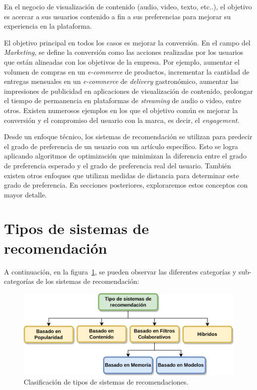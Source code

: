 \documentclass[11pt,a4paper,twoside]{thesis}
\begin{document}
En el negocio de visualización de contenido (audio, video, texto, etc..), el
objetivo es acercar a sus usuarios contenido a fin a sus preferencias para
mejorar su experiencia en la plataforma.

El objetivo principal en todos los casos es mejorar la conversión. En el campo
del \textit{Marketing}, se define la conversión como las acciones realizadas
por los usuarios que están alineadas con los objetivos de la empresa. Por
ejemplo, aumentar el volumen de compras en un \textit{e-commerce} de productos,
incrementar la cantidad de entregas mensuales en un \textit{e-commerce} de
\textit{delivery} gastronómico, aumentar las impresiones de publicidad en
aplicaciones de visualización de contenido, prolongar el tiempo de permanencia
en plataformas de \textit{streaming} de audio o video, entre otros. Existen
numerosos ejemplos en los que el objetivo común es mejorar la conversión y el
compromiso del usuario con la marca, es decir, el \textit{engagement}.

Desde un enfoque técnico, los sistemas de recomendación se utilizan para
predecir el grado de preferencia de un usuario con un artículo específico. Esto
se logra aplicando algoritmos de optimización que minimizan la diferencia entre
el grado de preferencia esperado y el grado de preferencia real del usuario.
También existen otros enfoques que utilizan medidas de distancia para
determinar este grado de preferencia. En secciones posteriores, exploraremos
estos conceptos con mayor detalle.

\clearpage
\section{Tipos de sistemas de recomendación}

A continuación, en la figura~\ref{fig:clasification}, se pueden observar las
diferentes categorías y sub-categorías de los sistemas de recomendación:

\begin{figure}[!htb]
	\centering
	\includegraphics[width=12cm]{./images/clasificacion-sis-rec.png}
	\caption{Clasificación de tipos de sistemas de recomendaciones.}
	\label{fig:clasification}
\end{figure}
\end{document}
